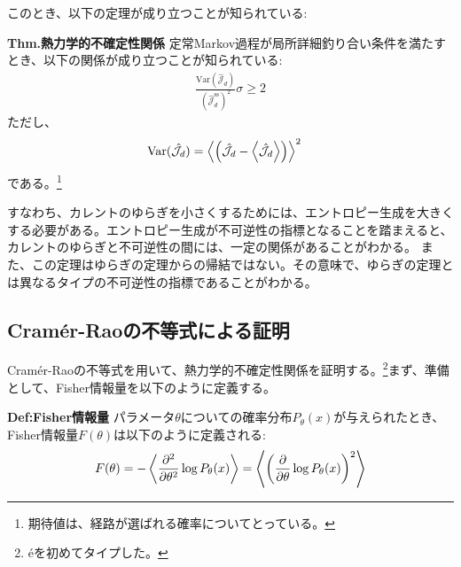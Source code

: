 \documentclass[a4paper,11pt]{jsarticle}
\numberwithin{equation}{section}
\begin{document}
このとき、以下の定理が成り立つことが知られている:

\begin{itembox}[l]{\textbf{Thm.熱力学的不確定性関係}}
    定常Markov過程が局所詳細釣り合い条件を満たすとき、以下の関係が成り立つことが知られている:
    \begin{align}
        \frac{\text{Var}(\hat{\mathcal{J}}_d)}{(\hat{\mathcal{J}}_d^{\text{ss}})^2} \sigma \geq 2
    \end{align}
    ただし、
    \begin{align}
        \text{Var}(\hat{\mathcal{J}}_d) &= \ev{\qty(\hat{\mathcal{J}}_d -\ev{\hat{\mathcal{J}_d}})}^2
    \end{align}
    である。\footnote{期待値は、経路が選ばれる確率についてとっている。}
\end{itembox}
すなわち、カレントのゆらぎを小さくするためには、エントロピー生成を大きくする必要がある。エントロピー生成が不可逆性の指標となることを踏まえると、カレントのゆらぎと不可逆性の間には、一定の関係があることがわかる。
また、この定理はゆらぎの定理からの帰結ではない。その意味で、ゆらぎの定理とは異なるタイプの不可逆性の指標であることがわかる。

\subsection{Cram\'er-Raoの不等式による証明}
Cram\'er-Raoの不等式を用いて、熱力学的不確定性関係を証明する。\footnote{\'eを初めてタイプした。}まず、準備として、Fisher情報量を以下のように定義する。
\begin{itembox}[l]{\textbf{Def:Fisher情報量}}
    パラメータ$\theta$についての確率分布$P_{\theta}(x)$が与えられたとき、Fisher情報量$F(\theta)$は以下のように定義される:
    \begin{align}
        F(\theta) = -\ev{\pdv[2]{\theta} \log P_{\theta}(x)} =\ev{\qty(\pdv{\theta} \log P_{\theta}(x))^2}
    \end{align}
\end{itembox}
\end{document}

